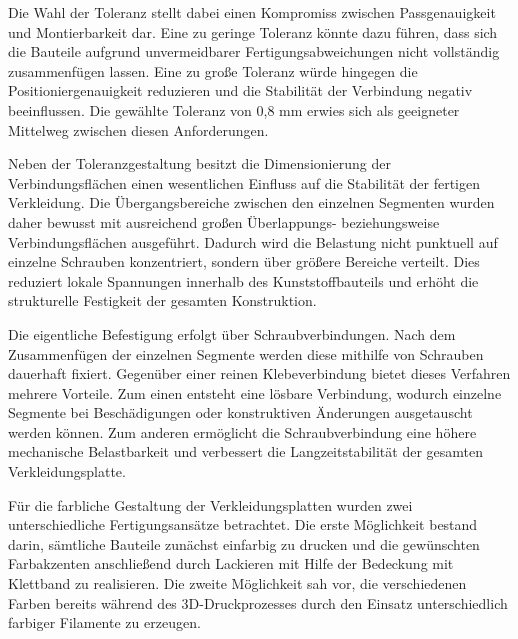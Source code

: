 Die Wahl der Toleranz stellt dabei einen Kompromiss zwischen Passgenauigkeit und Montierbarkeit dar. Eine zu geringe Toleranz könnte dazu führen, dass sich die Bauteile aufgrund unvermeidbarer Fertigungsabweichungen nicht vollständig zusammenfügen lassen. Eine zu große Toleranz würde hingegen die Positioniergenauigkeit reduzieren und die Stabilität der Verbindung negativ beeinflussen. Die gewählte Toleranz von 0,8 mm erwies sich als geeigneter Mittelweg zwischen diesen Anforderungen.

Neben der Toleranzgestaltung besitzt die Dimensionierung der Verbindungsflächen einen wesentlichen Einfluss auf die Stabilität der fertigen Verkleidung. Die Übergangsbereiche zwischen den einzelnen Segmenten wurden daher bewusst mit ausreichend großen Überlappungs- beziehungsweise Verbindungsflächen ausgeführt. Dadurch wird die Belastung nicht punktuell auf einzelne Schrauben konzentriert, sondern über größere Bereiche verteilt. Dies reduziert lokale Spannungen innerhalb des Kunststoffbauteils und erhöht die strukturelle Festigkeit der gesamten Konstruktion.

Die eigentliche Befestigung erfolgt über Schraubverbindungen. Nach dem Zusammenfügen der einzelnen Segmente werden diese mithilfe von Schrauben dauerhaft fixiert. Gegenüber einer reinen Klebeverbindung bietet dieses Verfahren mehrere Vorteile. Zum einen entsteht eine lösbare Verbindung, wodurch einzelne Segmente bei Beschädigungen oder konstruktiven Änderungen ausgetauscht werden können. Zum anderen ermöglicht die Schraubverbindung eine höhere mechanische Belastbarkeit und verbessert die Langzeitstabilität der gesamten Verkleidungsplatte.


Für die farbliche Gestaltung der Verkleidungsplatten wurden zwei unterschiedliche Fertigungsansätze betrachtet. Die erste Möglichkeit bestand darin, sämtliche Bauteile zunächst einfarbig zu drucken und die gewünschten Farbakzenten anschließend durch Lackieren mit Hilfe der Bedeckung mit Klettband zu realisieren. Die zweite Möglichkeit sah vor, die verschiedenen Farben bereits während des 3D-Druckprozesses durch den Einsatz unterschiedlich farbiger Filamente zu erzeugen.

